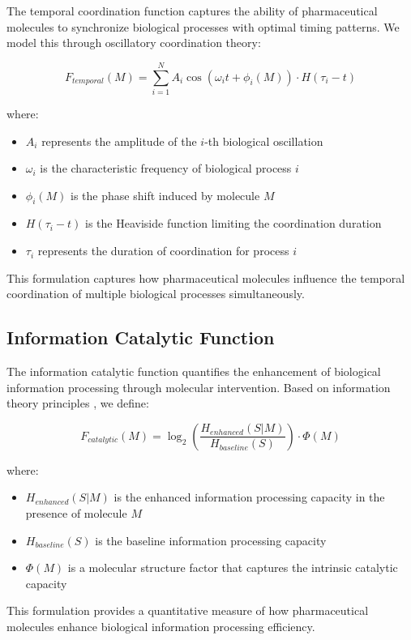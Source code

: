 \documentclass[12pt,a4paper]{article}
\begin{document}
The temporal coordination function captures the ability of pharmaceutical molecules to synchronize biological processes with optimal timing patterns. We model this through oscillatory coordination theory:

$$F_{temporal}(M) = \sum_{i=1}^{N} A_i \cos(\omega_i t + \phi_i(M)) \cdot H(\tau_i - t)$$

where:
\begin{itemize}
\item $A_i$ represents the amplitude of the $i$-th biological oscillation
\item $\omega_i$ is the characteristic frequency of biological process $i$
\item $\phi_i(M)$ is the phase shift induced by molecule $M$
\item $H(\tau_i - t)$ is the Heaviside function limiting the coordination duration
\item $\tau_i$ represents the duration of coordination for process $i$
\end{itemize}

This formulation captures how pharmaceutical molecules influence the temporal coordination of multiple biological processes simultaneously.

\subsection{Information Catalytic Function}

The information catalytic function quantifies the enhancement of biological information processing through molecular intervention. Based on information theory principles \citep{shannon1948mathematical}, we define:

$$F_{catalytic}(M) = \log_2\left(\frac{H_{enhanced}(S|M)}{H_{baseline}(S)}\right) \cdot \Phi(M)$$

where:
\begin{itemize}
\item $H_{enhanced}(S|M)$ is the enhanced information processing capacity in the presence of molecule $M$
\item $H_{baseline}(S)$ is the baseline information processing capacity
\item $\Phi(M)$ is a molecular structure factor that captures the intrinsic catalytic capacity
\end{itemize}

This formulation provides a quantitative measure of how pharmaceutical molecules enhance biological information processing efficiency.
\end{document}
